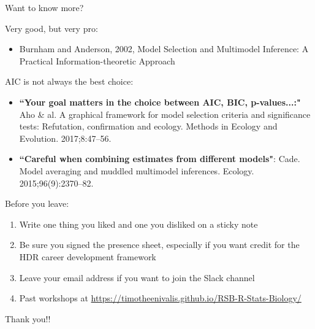 \documentclass[10pt]{beamer}\usepackage[]{graphicx}\usepackage[]{color}
\begin{document}
\begin{frame}{Want to know more?}

\begin{exampleblock}{Very good, but very pro:}
  \begin{itemize}
    \item Burnham and Anderson, 2002, Model Selection and Multimodel Inference: A Practical Information-theoretic Approach
  \end{itemize}
\end{exampleblock}

\begin{alertblock}{AIC is not always the best choice:}
\begin{itemize}
  \item \textbf{``Your goal matters in the choice between AIC, BIC, p-values...:"} Aho \& al. A graphical framework for model selection criteria and significance tests: Refutation, confirmation and ecology. Methods in Ecology and Evolution. 2017;8:47–56.
  \item \textbf{``Careful when combining estimates from different models"}: Cade. Model averaging and muddled multimodel inferences. Ecology. 2015;96(9):2370–82.
\end{itemize}
\end{alertblock}

\end{frame}

\begin{frame}{Before you leave:}
  \begin{enumerate}
    \item Write one thing you liked and one you disliked on a sticky note
    \item Be sure you signed the presence sheet, especially if you want credit for the HDR career development framework
    \item Leave your email address if you want to join the Slack channel 
    \item Past workshops at \url{https://timotheenivalis.github.io/RSB-R-Stats-Biology/} 
  \end{enumerate}

\vfill
\hfill Thank you!!

\end{frame}
\end{document}
